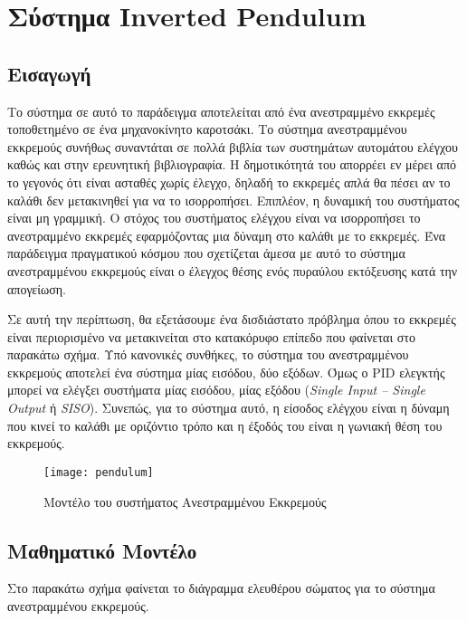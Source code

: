 \section{Σύστημα Inverted Pendulum} \label{sec:inverted_pendulum}

\subsection{Εισαγωγή}

Το σύστημα σε αυτό το παράδειγμα αποτελείται από ένα ανεστραμμένο εκκρεμές τοποθετημένο σε ένα μηχανοκίνητο καροτσάκι. Το σύστημα ανεστραμμένου εκκρεμούς συνήθως συναντάται σε πολλά βιβλία των συστημάτων αυτομάτου ελέγχου καθώς και στην ερευνητική βιβλιογραφία. Η δημοτικότητά του απορρέει εν μέρει από το γεγονός ότι είναι ασταθές χωρίς έλεγχο, δηλαδή το εκκρεμές απλά θα πέσει αν το καλάθι δεν μετακινηθεί για να το ισορροπήσει. Επιπλέον, η δυναμική του συστήματος είναι μη γραμμική. Ο στόχος του συστήματος ελέγχου είναι να ισορροπήσει το ανεστραμμένο εκκρεμές εφαρμόζοντας μια δύναμη στο καλάθι με το εκκρεμές. Ένα παράδειγμα πραγματικού κόσμου που σχετίζεται άμεσα με αυτό το σύστημα ανεστραμμένου εκκρεμούς είναι ο έλεγχος θέσης ενός πυραύλου εκτόξευσης κατά την απογείωση.

Σε αυτή την περίπτωση, θα εξετάσουμε ένα δισδιάστατο πρόβλημα όπου το εκκρεμές είναι περιορισμένο να μετακινείται στο κατακόρυφο επίπεδο που φαίνεται στο παρακάτω σχήμα. Υπό κανονικές συνθήκες, το σύστημα του ανεστραμμένου εκκρεμούς αποτελεί ένα σύστημα μίας εισόδου, δύο εξόδων. Όμως ο PID ελεγκτής μπορεί να ελέγξει συστήματα μίας εισόδου, μίας εξόδου (\emph{Single Input  --  Single Output} ή \emph{SISO}). Συνεπώς, για το σύστημα αυτό, η είσοδος ελέγχου είναι η δύναμη που κινεί το καλάθι με οριζόντιο τρόπο και η έξοδός του είναι η γωνιακή θέση του εκκρεμούς.

\begin{figure}[h]
  \centering
  \texttt{[image: pendulum]}
  \caption{Μοντέλο του συστήματος Ανεστραμμένου Εκκρεμούς}
  \label{fig:pendulum}
\end{figure}

\subsection{Μαθηματικό Μοντέλο}

Στο παρακάτω σχήμα φαίνεται το διάγραμμα ελευθέρου σώματος για το σύστημα ανεστραμμένου εκκρεμούς.

